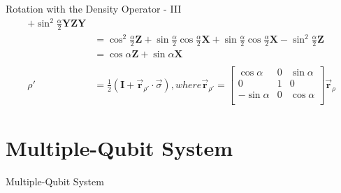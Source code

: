 \documentclass{beamer}
\begin{document}
\begin{frame}{Rotation with the Density Operator - III}
{\begin{align*}
                + \sin^2\frac{\alpha}2 \mathbf{Y}\mathbf{Z}\mathbf{Y} \\
            &=    \cos^2\frac{\alpha}2 \mathbf{Z}
                + \sin\frac{\alpha}2 \cos\frac{\alpha}2 \mathbf{X}
                + \sin\frac{\alpha}2 \cos\frac{\alpha}2 \mathbf{X}
                - \sin^2\frac{\alpha}2 \mathbf{Z} \\
            &= \cos\alpha \mathbf{Z} + \sin\alpha \mathbf{X} \\
      \\
      \rho' &= \frac{1}2 ( \mathbf{I} + \overrightarrow{\mathbf{r}}_{\rho'} \cdot \overrightarrow{\sigma} )
            , where \overrightarrow{\mathbf{r}}_{\rho'} =
              \begin{bmatrix}
                \cos\alpha  & 0 & \sin\alpha \\
                0           & 1 & 0 \\
                -\sin\alpha & 0 & \cos\alpha \\
              \end{bmatrix}
              \overrightarrow{\mathbf{r}}_{\rho}
    \end{align*}
  }%
\end{frame}

\section{Multiple-Qubit System}
\begin{frame}
  Multiple-Qubit System
\end{frame}
\end{document}
